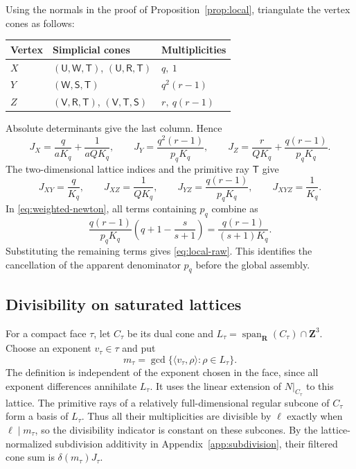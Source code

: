 \documentclass[11pt]{article}
\numberwithin{equation}{section}
\theoremstyle{definition}
\theoremstyle{remark}
\newcommand{\ZZ}{\mathbf Z}
\newcommand{\RR}{\mathbf R}
\begin{document}
Using the normals in the proof of Proposition~\ref{prop:local},
triangulate the vertex cones as follows:
\begin{center}
\begin{tabular}{lll}
\toprule
Vertex & Simplicial cones & Multiplicities\\
\midrule
$X$ & $(\mathsf U,\mathsf W,\mathsf T)$,
       $(\mathsf U,\mathsf R,\mathsf T)$ & $q,\ 1$\\
$Y$ & $(\mathsf W,\mathsf S,\mathsf T)$ & $q^2(r-1)$\\
$Z$ & $(\mathsf V,\mathsf R,\mathsf T)$,
       $(\mathsf V,\mathsf T,\mathsf S)$ & $r,\ q(r-1)$\\
\bottomrule
\end{tabular}
\end{center}
Absolute determinants give the last column. Hence
\[
 J_X=\frac q{aK_q}+\frac1{aQK_q},\qquad
 J_Y=\frac{q^2(r-1)}{p_qK_q},\qquad
 J_Z=\frac r{QK_q}+\frac{q(r-1)}{p_qK_q}.
\]
The two-dimensional lattice indices and the primitive ray
$\mathsf T$ give
\[
 J_{XY}=\frac q{K_q},\qquad
 J_{XZ}=\frac1{QK_q},\qquad
 J_{YZ}=\frac{q(r-1)}{p_qK_q},\qquad
 J_{XYZ}=\frac1{K_q}.
\]
In \eqref{eq:weighted-newton}, all terms containing $p_q$ combine
as
\[
 \frac{q(r-1)}{p_qK_q}
       \left(q+1-\frac{s}{s+1}\right)
       =\frac{q(r-1)}{(s+1)K_q}.
\]
Substituting the remaining terms gives
\eqref{eq:local-raw}. This identifies the cancellation of the
apparent denominator $p_q$ before the global assembly.

\subsection{Divisibility on saturated lattices}\label{app:filter}

For a compact face $\tau$, let $C_\tau$ be its dual cone and
$L_\tau=\operatorname{span}_{\RR}(C_\tau)\cap\ZZ^3$.
Choose an exponent $v_\tau\in\tau$ and put
\[
 m_\tau=\gcd\{\langle v_\tau,\rho\rangle:\rho\in L_\tau\}.
\]
The definition is independent of the exponent chosen in the
face, since all exponent differences annihilate $L_\tau$.
It uses the linear extension of $N|_{C_\tau}$ to this lattice.
The primitive rays of a relatively full-dimensional regular
subcone of $C_\tau$ form a basis of $L_\tau$. Thus all their
multiplicities are divisible by $\ell$ exactly when
$\ell\mid m_\tau$, so the divisibility indicator is constant
on these subcones. By the lattice-normalized subdivision
additivity in Appendix~\ref{app:subdivision}, their filtered
cone sum is $\delta(m_\tau)J_\tau$.
\end{document}
